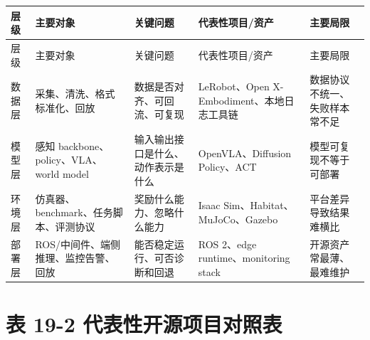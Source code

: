 \begingroup
\small
\begin{xltabular}{\textwidth}{YYYYY}
\toprule
层级 & 主要对象 & 关键问题 & 代表性项目/资产 & 主要局限 \\
\midrule
\endfirsthead
\toprule
层级 & 主要对象 & 关键问题 & 代表性项目/资产 & 主要局限 \\
\midrule
\endhead
数据层 & 采集、清洗、格式标准化、回放 & 数据是否对齐、可回流、可复现 & LeRobot、Open X-Embodiment、本地日志工具链 & 数据协议不统一、失败样本常不足 \\
模型层 & 感知 backbone、policy、VLA、world model & 输入输出接口是什么、动作表示是什么 & OpenVLA、Diffusion Policy、ACT & 模型可复现不等于可部署 \\
环境层 & 仿真器、benchmark、任务脚本、评测协议 & 奖励什么能力、忽略什么能力 & Isaac Sim、Habitat、MuJoCo、Gazebo & 平台差异导致结果难横比 \\
部署层 & ROS/中间件、端侧推理、监控告警、回放 & 能否稳定运行、可否诊断和回退 & ROS 2、edge runtime、monitoring stack & 开源资产常最薄、最难维护 \\
\bottomrule
\end{xltabular}
\endgroup

\section*{表 19-2 代表性开源项目对照表}

